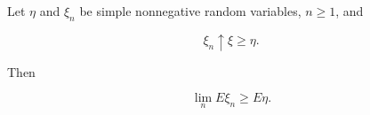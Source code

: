 Let $\eta$ and $\xi_n$ be simple nonnegative random variables, $n \geq 1$, and

$$\xi_n \uparrow \xi \geq \eta.$$

Then

$$\lim_n E\xi_n \geq E\eta.$$

